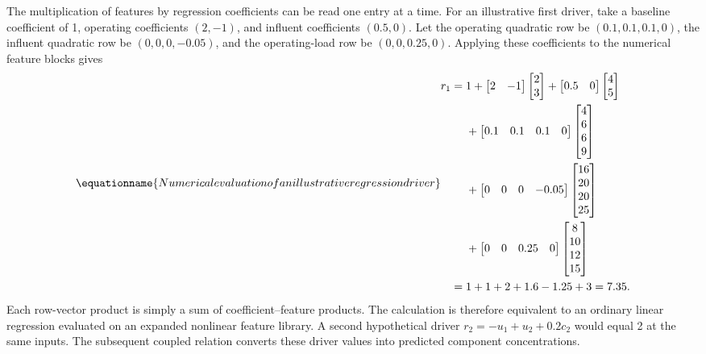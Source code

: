 The multiplication of features by regression coefficients can be read one entry at a time. For an illustrative first driver, take a baseline coefficient of 1, operating coefficients \((2,-1)\), and influent coefficients \((0.5,0)\). Let the operating quadratic row be \((0.1,0.1,0.1,0)\), the influent quadratic row be \((0,0,0,-0.05)\), and the operating-load row be \((0,0,0.25,0)\). Applying these coefficients to the numerical feature blocks gives
\begin{equation}
\equationname{Numerical evaluation of an illustrative regression driver}
\label{eq:icsor_driver_multiplication_example}
\begin{aligned}
r_1={}&1+\begin{bmatrix}2&-1\end{bmatrix}\begin{bmatrix}2\\3\end{bmatrix}
+\begin{bmatrix}0.5&0\end{bmatrix}\begin{bmatrix}4\\5\end{bmatrix}\\
&+\begin{bmatrix}0.1&0.1&0.1&0\end{bmatrix}\begin{bmatrix}4\\6\\6\\9\end{bmatrix}\\
&+\begin{bmatrix}0&0&0&-0.05\end{bmatrix}\begin{bmatrix}16\\20\\20\\25\end{bmatrix}\\
&+\begin{bmatrix}0&0&0.25&0\end{bmatrix}\begin{bmatrix}8\\10\\12\\15\end{bmatrix}\\
={}&1+1+2+1.6-1.25+3=7.35.
\end{aligned}
\end{equation}
Each row-vector product is simply a sum of coefficient--feature products. The calculation is therefore equivalent to an ordinary linear regression evaluated on an expanded nonlinear feature library. A second hypothetical driver \(r_2=-u_1+u_2+0.2c_2\) would equal 2 at the same inputs. The subsequent coupled relation converts these driver values into predicted component concentrations.

